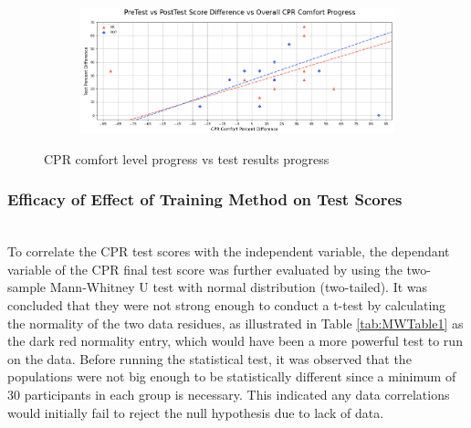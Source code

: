 \documentclass[manuscript]{./Models/acmart}
\begin{document}
\begin{figure}[h]
    \centering
    \begin{subfigure}[b]{0.9\textwidth}
        \centering
        \includegraphics[width=\textwidth]{Photos/CPRGraph.PNG}
    \end{subfigure}
    \caption{CPR comfort level progress vs test results progress}
    \label{fig:CPRGraph}
\vspace{-2mm}
\end{figure}

\subsubsection{Efficacy of Effect of Training Method on Test Scores}
\hfill\\
To correlate the CPR test scores with the independent variable, the dependant variable of the CPR final test score was further evaluated by using the two-sample Mann-Whitney U test with normal distribution (two-tailed). It was concluded that they were not strong enough to conduct a t-test by calculating the normality of the two data residues, as illustrated in Table \ref{tab:MWTable1} as the dark red normality entry, which would have been a more powerful test to run on the data. Before running the statistical test, it was observed that the populations were not big enough to be statistically different since a minimum of 30 participants in each group is necessary. This indicated any data correlations would initially fail to reject the null hypothesis due to lack of data. 
\end{document}
